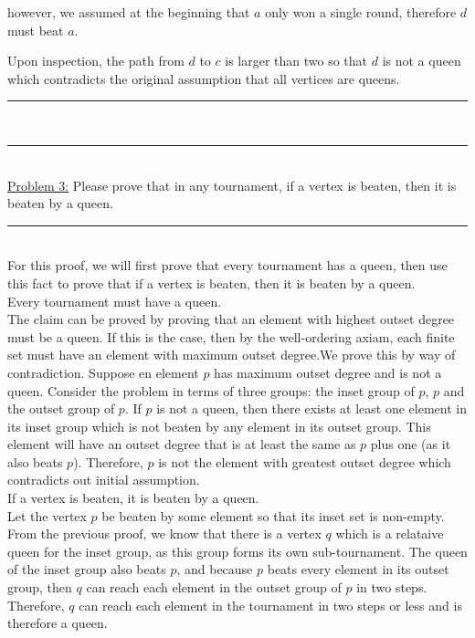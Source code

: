 \documentclass{article}
\newcommand{\problemsep}{\leavevmode\\[0.05in] \rule[\baselineskip/4]{\textwidth}{1pt} \\[0.005in] \rule[\baselineskip]{\textwidth}{1pt}\vspace{-\baselineskip}\leavevmode\\[0.05in]}
\newcommand{\statementsep}{\leavevmode\\[0.005in] \rule[\baselineskip/4]{\textwidth}{0.4pt}\leavevmode\\[0.005in]}
\begin{document}
\begin{center}
\end{center}
however, we assumed at the beginning that $a$ only won a single round, therefore $d$ must beat $a$.
\begin{center}
\end{center}
Upon inspection, the path from $d$ to $c$ is larger than two so that $d$ is not a queen which contradicts the original assumption that all vertices are queens.
\problemsep
\noindent\underline{Problem 3:} Please prove that in any tournament, if a vertex is beaten, then it is beaten
by a queen. 
\statementsep
For this proof, we will first prove that every tournament has a queen, then use this fact to prove that if a vertex is beaten, then it is beaten by a queen.\\[0.05in]
 Every tournament must have a queen. \\[0.05in]
 The claim can be proved by proving that an element with highest outset degree must be a queen.  If this is the case, then by the well-ordering axiam, each finite set must have an element with maximum outset degree.We prove this by way of contradiction. Suppose en element $p$ has maximum outset degree and is not a queen. Consider the problem in terms of three groups: the inset group of $p$, $p$ and the outset group of $p$. If $p$ is not a queen, then there exists at least one element in its inset group which is not beaten by any element in its outset group. This element will have an outset degree that is at least the same as $p$ plus one (as it also beats $p$). Therefore, $p$ is not the element with greatest outset degree which contradicts out initial assumption. \\[0.05in]
 If a vertex is beaten, it is beaten by a queen. \\[0.05in]
 Let the vertex $p$ be beaten by some element so that its inset set is non-empty. From the previous proof, we know that there is a vertex $q$ which is a relataive queen for the inset group, as this group forms its own sub-tournament. The queen of the inset group also beats $p$, and because $p$ beats every element in its outset group, then $q$ can reach each element in the outset group of $p$ in two steps.  Therefore, $q$ can reach each element in the tournament in two steps or less and is therefore a queen.
\end{document}
